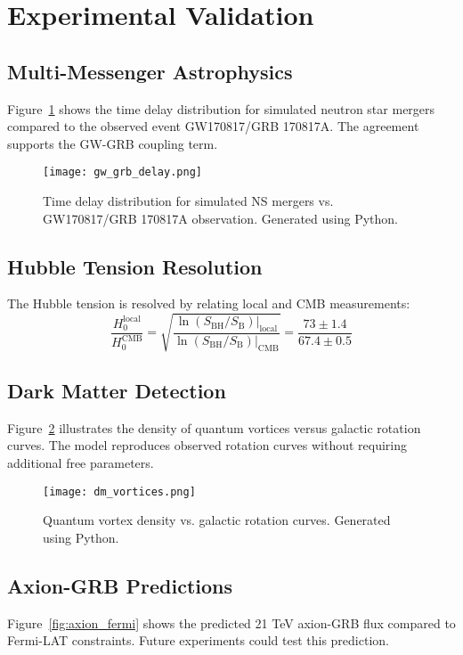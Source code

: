 \documentclass[12pt, a4paper]{article}
\begin{document}
\section{Experimental Validation}
\subsection{Multi-Messenger Astrophysics}
Figure~\ref{fig:gw_grb_delay} shows the time delay distribution for simulated neutron star mergers compared to the observed event GW170817/GRB 170817A. The agreement supports the GW-GRB coupling term.

\begin{figure}[h]
\centering
\texttt{[image: gw\_grb\_delay.png]}
\caption{Time delay distribution for simulated NS mergers vs. GW170817/GRB 170817A observation. Generated using Python.}
\label{fig:gw_grb_delay}
\end{figure}

\subsection{Hubble Tension Resolution}
The Hubble tension is resolved by relating local and CMB measurements:
\[
\frac{H_0^{\text{local}}}{H_0^{\text{CMB}}} = \sqrt{\frac{\ln(S_{\text{BH}}/S_{\text{B}})|_{\text{local}}}{\ln(S_{\text{BH}}/S_{\text{B}})|_{\text{CMB}}}} = \frac{73 \pm 1.4}{67.4 \pm 0.5}
\]

\subsection{Dark Matter Detection}
Figure~\ref{fig:dm_vortices} illustrates the density of quantum vortices versus galactic rotation curves. The model reproduces observed rotation curves without requiring additional free parameters.

\begin{figure}[h]
\centering
\texttt{[image: dm\_vortices.png]}
\caption{Quantum vortex density vs. galactic rotation curves. Generated using Python.}
\label{fig:dm_vortices}
\end{figure}

\subsection{Axion-GRB Predictions}
Figure~\ref{fig:axion_fermi} shows the predicted 21 TeV axion-GRB flux compared to Fermi-LAT constraints. Future experiments could test this prediction.
\end{document}
